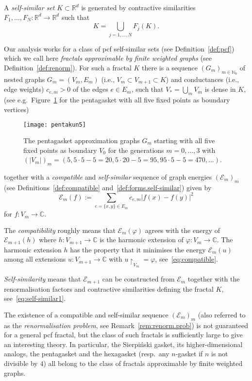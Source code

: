 \documentclass[12pt,reqno,a4paper]{amsart}            %
\numberwithin{equation}{section}
\theoremstyle{mythmstyle}       %
\theoremstyle{mydefstyle}        %
\newcommand{\Fig}[1]{Figure~\ref{fig:#1}}
\newcommand{\Rem}[1]{Remark~\ref{rem:#1}}
\newcommand{\Def}[1]{Definition~\ref{def:#1}}
\newcommand{\Defs}[2]{Definitions~\ref{def:#1} and~\ref{def:#2}}
\newcommand{\abssqr}[2][{}]{\lvert{#2}\rvert^2_{#1}} %
\newcommand{\map}[3]{ #1 \colon #2 \longrightarrow #3}    %
\newcommand{\restr}[1]{{\restriction}_{#1}} %
\newcommand{\card}[1]{\lvert#1\rvert}   %
\renewcommand{\phi}{\varphi}   %
\newcommand{\R}{\mathbb{R}} %
\newcommand{\C}{\mathbb{C}} %
\newcommand{\N}{\mathbb{N}} %
\newcommand{\1}{\mathbbm 1}                    %
\newcommand{\Sierpinski}{Sierpi\'nski\xspace}
\newcommand{\pcf}{pcf\xspace}
\newcommand{\energy}{\mathcal E}
\newcommand{\conductance}{c}  %
\begin{document}
A \emph{self-similar set} $K \subset \R^d$ is generated by contractive
similarities $\map{F_1,\dots, F_N} {\R^d}{\R^d}$ such that
\begin{equation}
  \label{eq:similarities}
  K = \bigcup_{j=1,\dots,N} F_j(K).
\end{equation}

Our analysis works for a class of \pcf self-similar sets (see
\Def{pcf}) which we call here \emph{fractals approximable by finite
  weighted graphs} (see \Def{renorm}).  For such a fractal $K$ there
is a sequence $(G_m)_{m \in \N_0}$ of nested graphs $G_m=(V_m,E_m)$
(i.e., $V_m \subset V_{m+1} \subset K$) and conductances (i.e., edge
weights) $\conductance_{e,m}>0$ of the edges $e \in E_m$, such that
$V_*=\bigcup_m V_m$ is dense in $K$, (see e.g.\ \Fig{pentagasket5} for
the pentagasket with all five fixed points as boundary vertices)
\begin{figure}[h] 
  \centering
  \texttt{[image: pentakun5]}
\caption{The pentagasket approximation graphs $G_m$ starting with all
  five fixed points as boundary $V_0$ for the generations
  $m=0,\dots,3$ with $(\card {V_m})_m=(5, 5\cdot 5-5=20, 5\cdot
  20-5=95, 95 \cdot 5-5 =470, \dots)$.}
  \label{fig:pentagasket5}
\end{figure}
together with a \emph{compatible} and \emph{self-similar} sequence of
graph energies $(\energy_m)_m$ (see
\Defs{compatible}{forms.self-similar}) given by
\begin{equation}
  \label{eq:graph.energy}
  \energy_m(f)
  := \sum_{ e=\{x,y\} \in E_m} \conductance_{e,m} \abssqr{f(x)-f(y)}
\end{equation}
for $\map f {V_m} \C$.

The \emph{compatibility} roughly means that $\energy_m(\phi)$ agrees
with the energy of $\energy_{m+1}(h)$ where $\map h {V_{m+1}} \C$ is
the harmonic extension of $\map \phi {V_m} \C$.  The harmonic
extension $h$ has the property that it minimises the energy
$\energy_m(u)$ among all extensions $\map u {V_{m+1}} \C$ with $u
\restr{V_m}=\phi$, see~\eqref{eq:compatible}.

\emph{Self-similarity} means that $\energy_{m+1}$ can be constructed
from $\energy_m$ together with the renormalisation factors and contractive 
similarities defining the fractal $K$,
see~\eqref{eq:self-similar1}.

The existence of a compatible and self-similar sequence
$(\energy_m)_m$ (also referred to as the \emph{renormalisation
  problem}, see \Rem{renorm.prob}) is not guaranteed for a general
\pcf fractal, but the class of such fractals is sufficiently large to
give an interesting theory.  In particular, the \Sierpinski gasket,
its higher-dimensional analogs, the pentagasket and the hexagasket
(resp.\ any $n$-gasket if $n$ is not divisible by $4$) all belong to
the class of fractals approximable by finite weighted graphs.
\end{document}
